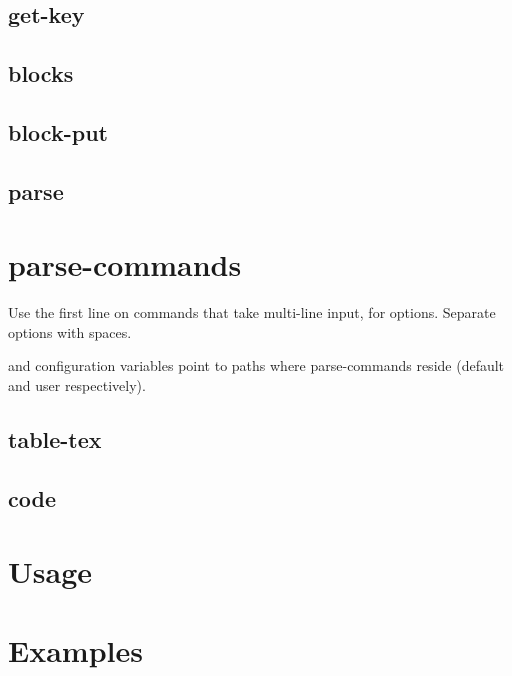 \documentclass{memoir}
\begin{document}
	\section{get-key}
	\section{blocks}
	\section{block-put}
	\section{parse}


\chapter{parse-commands} %
	Use the first line on commands that take multi-line input, for options.
	Separate options with spaces.

	and  configuration variables point to paths where 
	parse-commands reside (default and user respectively).

	\section{table-tex}
	\section{code}


\chapter{Usage}
\chapter{Examples}

\printglossary
\end{document}

